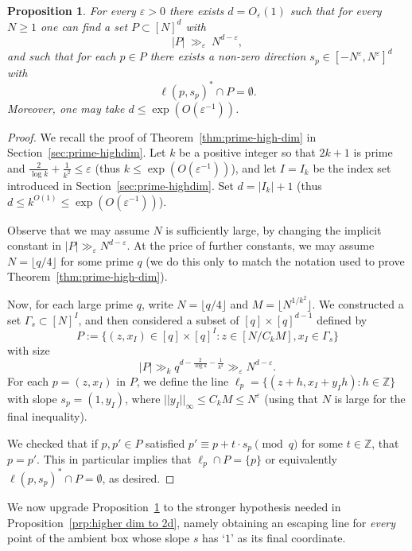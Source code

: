 \documentclass[12pt,reqno]{amsart}
\theoremstyle{plain}
\newtheorem{proposition}[theorem]{Proposition}
\theoremstyle{definition}
\newcommand{\Z}{\mathbb{Z}}
\newcommand{\1}{\mathbf{1}}
\newcommand{\abs}[1]{\left|#1\right|}
\begin{document}
\begin{proposition}\label{prop:lattice matching}
For every $\varepsilon>0$ there exists $d=O_\varepsilon(1)$ such that for every $N\ge 1$ one can find a set
$P\subset [N]^d$ with
\[
  |P|\ \gg_\varepsilon\ N^{d-\varepsilon},
\]
and such that for each $p\in P$ there exists a non-zero direction $s_p\in [-N^{\varepsilon},N^\varepsilon]^d$ with
\[
  \ell(p,s_p)^\ast\cap P=\emptyset.
\]
Moreover, one may take $d\le \exp(O(\varepsilon^{-1}))$.
\end{proposition}

\begin{proof}
 We recall the proof of Theorem~\ref{thm:prime-high-dim} in Section~\ref{sec:prime-highdim}. Let $k$ be a positive integer so that $2k+1$ is prime and $\frac{2}{\log k}+\frac{1}{k^2}\le \varepsilon$ (thus $k\le \exp(O(\varepsilon^{-1}))$), and let $I = I_k$ be the index set introduced in Section~\ref{sec:prime-highdim}. Set $d = |I_k| + 1$ (thus $d\le k^{O(1)}\le \exp(O(\varepsilon^{-1}))$).
 
 Observe that we may assume $N$ is sufficiently large, by changing the implicit constant in $|P|\gg_\varepsilon N^{d-\varepsilon}$. At the price of further constants, we may assume $N=\lfloor q/4\rfloor$ for some prime $q$ (we do this only to match the notation used to prove Theorem~\ref{thm:prime-high-dim}).
 
 Now, for each large prime $q$, write $N = \lfloor{q / 4\rfloor}$ and $M = \lfloor{ N^{1 / k^2} \rfloor}$. We constructed a set $\Gamma_s \subset [N]^{I}$, and then considered a subset of $[q] \times [q]^{d - 1} $ defined by
    $$P := \{(z, x_I) \in [q] \times [q]^I: z \in [N / C_k M], x_I \in \Gamma_s\}$$
    with size
    $$\abs{P} \gg_k q^{d - \frac{2}{\log k} - \frac{1}{k^2}}\gg_\varepsilon N^{d-\varepsilon}.$$
    For each $p = (z, x_I)$ in $P$, we define the line $\ell_p = \{(z + h, x_I + y_I h): h \in \Z\}$ with slope $s_p = (1, y_I)$, where $||y_I||_\infty \leq C_k M \le N^{\varepsilon}$ (using that $N$ is large for the final inequality). 
    
    We checked that if $p,p'\in P$ satisfied $p'\equiv p+t\cdot s_p\pmod{q}$ for some $t\in \Z$, that $p=p'$. This in particular implies that $\ell_p\cap P=\{p\}$ or equivalently $\ell(p,s_p)^* \cap P=\emptyset$, as desired.
\end{proof}

We now upgrade Proposition~\ref{prop:lattice matching} to the stronger hypothesis needed in
Proposition~\ref{prp:higher dim to 2d}, namely obtaining an escaping line for \emph{every} point of the ambient box whose slope $s$ has `$1$' as its final coordinate. 
\end{document}
